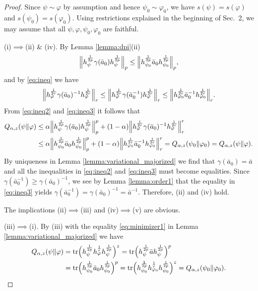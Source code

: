 \documentclass[12pt]{article}
\theoremstyle{definition}
\theoremstyle{remark}
\numberwithin{equation}{section}
\def\Tr{\mathrm{tr}}
\def\ffi{\varphi}
\def\1{\mathbf{1}}
\begin{document}
\begin{proof}
{Since $\psi\sim\ffi$ by assumption and hence $\psi_0\sim \ffi_0$, we have
$s(\psi)=s(\ffi)$ and $s(\psi_0)=s(\ffi_0)$.} Using restrictions {explained in the beginning
of Sec.~2}, we may assume that all $\psi,\ffi,\psi_0,\ffi_0$ are faithful.

(i)$\implies$(ii) \& (iv).\enspace
By Lemma \ref{lemma:dpi}(ii)
\begin{align}
\Big\|h_\psi^{1\over2p}\gamma(\bar a_0)h_\psi^{1\over2p}\Big\|_{p}
\le\Big\|h_{\psi_0}^{1\over2p}\bar a_0h_{\psi_0}^{1\over2p}\Big\|_{p},
\label{eq:ineq2}
\end{align}
and by \eqref{eq:ineq} we have
\begin{align}
\Big\|h_\ffi^{1\over2r}\gamma(\bar a_0)^{-1}h_\ffi^{1\over2r}\Big\|_{r}
\le\Big\|h_\ffi^{1\over2r}\gamma(\bar a_0^{-1})h_\ffi^{1\over2r}\Big\|_{r}
\le\Big\|h_{\ffi_0}^{1\over2r}\bar
a_0^{-1}h_{\ffi_0}^{1\over2r}\Big\|_{r}. \label{eq:ineq3}
\end{align}
From \eqref{eq:ineq2} and \eqref{eq:ineq3} it follows that
\begin{align*}
Q_{\alpha,z}(\psi\|\ffi)&\le \alpha\Big\|h_\psi^{1\over2p}\gamma(\bar
a_0)h_\psi^{1\over2p}\Big\|^p_{p}
+(1-\alpha)\Big\|h_\ffi^{1\over2r}\gamma(\bar a_0)^{-1}h_\ffi^{1\over2r}\Big\|^r_{r} \\
&\le\alpha\Big\|h_{\psi_0}^{1\over2p}\bar a_0h_{\psi_0}^{1\over2p}\Big\|^p_{p}
+(1-\alpha)\Big\|h_{\ffi_0}^{1\over2r}\bar a_0^{-1}h_{\ffi_0}^{1\over2r}\Big\|^r_{r}
=Q_{\alpha,z}(\psi_0\|\ffi_0)=Q_{\alpha,z}(\psi\|\ffi).
\end{align*}
By uniqueness in Lemma \ref{lemma:variational_majorized} we find that $\gamma(\bar
a_0)=\bar a$ and all the inequalities in \eqref{eq:ineq2} and \eqref{eq:ineq3} must
become equalities. Since $\gamma(\bar a_0^{-1})\ge\gamma(\bar a_0)^{-1}$, we see by
Lemma \ref{lemma:order1} that the equality in
\eqref{eq:ineq3} yields $\gamma(\bar a_0^{-1})=\gamma(\bar a_0)^{-1}=\bar a^{-1}$. Therefore,
(ii) and (iv) hold.

The implications (ii)$\implies$(iii) and (iv)$\implies$(v) are obvious.

(iii)$\implies$(i).\enspace
By (iii) with the equality \eqref{eq:minimizer1} in Lemma \ref{lemma:variational_majorized} we have
\begin{align*}
Q_{\alpha,z}(\psi\|\ffi)
&=\Tr\Bigl(h_\psi^{1\over2p}h_\ffi^{1\over r}h_\psi^{1\over2p}\Bigr)^z
=\Tr\Bigl(h_\psi^{1\over2p}\bar ah_\psi^{1\over2p}\Bigr)^{p} \\
&=\Tr\Bigl(h_{\psi_0}^{1\over2p}\bar a_0h_{\psi_0}^{1\over2p}\Bigr)^{p}
=\Tr\Bigl(h_{\psi_0}^{\1\over2p}h_{\ffi_0}^{1\over r}h_{\psi_0}^{1\over2p}\Bigr)^z
=Q_{\alpha,z}(\psi_0\|\ffi_0).
\end{align*}


\end{proof}
\end{document}
